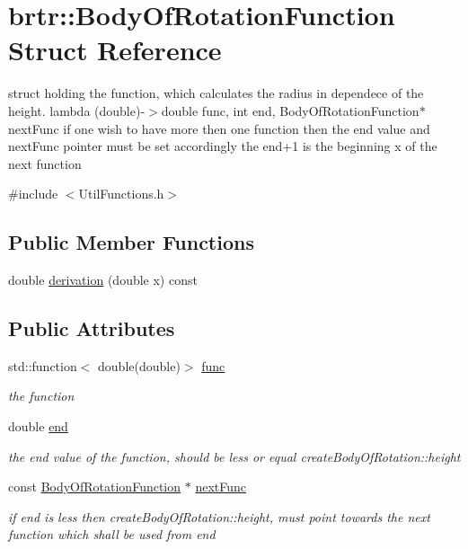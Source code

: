 \hypertarget{structbrtr_1_1_body_of_rotation_function}{\section{brtr\+:\+:Body\+Of\+Rotation\+Function Struct Reference}
\label{structbrtr_1_1_body_of_rotation_function}
}


struct holding the function, which calculates the radius in dependece of the height. lambda (double)-\/$>$double func, int end, Body\+Of\+Rotation\+Function$\ast$ next\+Func if one wish to have more then one function then the end value and next\+Func pointer must be set accordingly the end+1 is the beginning x of the next function  




{\ttfamily \#include $<$Util\+Functions.\+h$>$}

\subsection*{Public Member Functions}
\begin{DoxyCompactItemize}
\item 
double \hyperlink{structbrtr_1_1_body_of_rotation_function_a22861c378686dabe1c35c90a0a8dcf46}{derivation} (double x) const 
\end{DoxyCompactItemize}
\subsection*{Public Attributes}
\begin{DoxyCompactItemize}
\item 
std\+::function$<$ double(double)$>$ \hyperlink{structbrtr_1_1_body_of_rotation_function_a5fda598eb0a63696b059e3a27c01142b}{func}
\begin{DoxyCompactList}\small\item\em the function \end{DoxyCompactList}\item 
double \hyperlink{structbrtr_1_1_body_of_rotation_function_a46667ab72bfeddc305bf31fa359c8699}{end}
\begin{DoxyCompactList}\small\item\em the end value of the function, should be less or equal create\+Body\+Of\+Rotation\+::height \end{DoxyCompactList}\item 
const \hyperlink{structbrtr_1_1_body_of_rotation_function}{Body\+Of\+Rotation\+Function} $\ast$ \hyperlink{structbrtr_1_1_body_of_rotation_function_ad7df29eaeb2504928488691196cc06eb}{next\+Func}
\begin{DoxyCompactList}\small\item\em if end is less then create\+Body\+Of\+Rotation\+::height, must point towards the next function which shall be used from end \end{DoxyCompactList}\end{DoxyCompactItemize}


